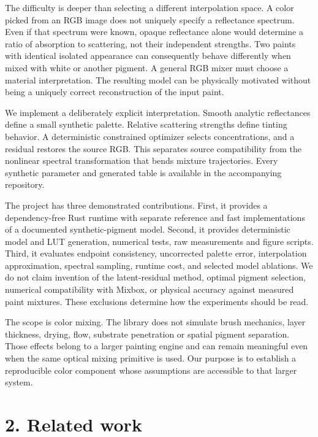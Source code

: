 \documentclass[
  10pt,
  twocolumn]{article}
\begin{document}
The difficulty is deeper than selecting a different interpolation space.
A color picked from an RGB image does not uniquely specify a reflectance
spectrum. Even if that spectrum were known, opaque reflectance alone
would determine a ratio of absorption to scattering, not their
independent strengths. Two paints with identical isolated appearance can
consequently behave differently when mixed with white or another
pigment. A general RGB mixer must choose a material interpretation. The
resulting model can be physically motivated without being a uniquely
correct reconstruction of the input paint.

We implement a deliberately explicit interpretation. Smooth analytic
reflectances define a small synthetic palette. Relative scattering
strengths define tinting behavior. A deterministic constrained optimizer
selects concentrations, and a residual restores the source RGB. This
separates source compatibility from the nonlinear spectral
transformation that bends mixture trajectories. Every synthetic
parameter and generated table is available in the accompanying
repository.

The project has three demonstrated contributions. First, it provides a
dependency-free Rust runtime with separate reference and fast
implementations of a documented synthetic-pigment model. Second, it
provides deterministic model and LUT generation, numerical tests, raw
measurements and figure scripts. Third, it evaluates endpoint
consistency, uncorrected palette error, interpolation approximation,
spectral sampling, runtime cost, and selected model ablations. We do not
claim invention of the latent-residual method, optimal pigment
selection, numerical compatibility with Mixbox, or physical accuracy
against measured paint mixtures. These exclusions determine how the
experiments should be read.

The scope is color mixing. The library does not simulate brush
mechanics, layer thickness, drying, flow, substrate penetration or
spatial pigment separation. Those effects belong to a larger painting
engine and can remain meaningful even when the same optical mixing
primitive is used. Our purpose is to establish a reproducible color
component whose assumptions are accessible to that larger system.

\hypertarget{related-work}{%
\section{2. Related work}\label{related-work}}
\end{document}
